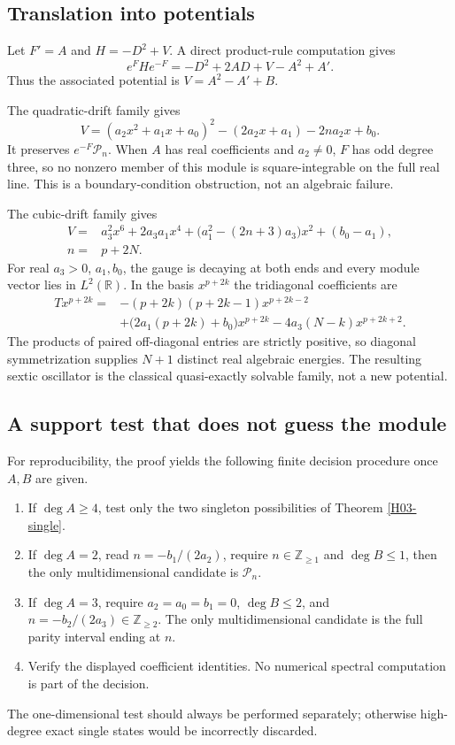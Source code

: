 \documentclass[11pt,a4paper]{article}
\theoremstyle{definition}\newtheorem{definition}[theorem]{Definition}
\theoremstyle{remark}\newtheorem{remark}[theorem]{Remark}
\newcommand{\R}{\mathbb R}\newcommand{\C}{\mathbb C}\newcommand{\N}{\mathbb N}
\newcommand{\Pcal}{\mathcal P}\newcommand{\PP}{\mathcal P}\newcommand{\Pp}{\mathcal P}
\numberwithin{equation}{section}
\begin{document}
\subsection{Translation into potentials}\label{H03-sec-5}
Let $F'=A$ and $H=-D^2+V$. A direct product-rule computation gives
\[e^FHe^{-F}=-D^2+2AD+V-A^2+A'.\]
Thus the associated potential is $V=A^2-A'+B$.

The quadratic-drift family gives
\[V=(a_2x^2+a_1x+a_0)^2-(2a_2x+a_1)-2na_2x+b_0.\]
It preserves $e^{-F}\Pcal_n$. When $A$ has real coefficients and $a_2\ne0$, $F$ has odd degree three, so no nonzero member of this module is square-integrable on the full real line. This is a boundary-condition obstruction, not an algebraic failure.

The cubic-drift family gives
\begin{align*}
V={}&a_3^2x^6+2a_3a_1x^4
+\bigl(a_1^2-(2n+3)a_3\bigr)x^2+(b_0-a_1),\\
n={}&p+2N.
\end{align*}
For real $a_3>0$, $a_1,b_0$, the gauge is decaying at both ends and every module vector lies in $L^2(\R)$. In the basis $x^{p+2k}$ the tridiagonal coefficients are
\begin{align*}
T x^{p+2k}={}&-(p+2k)(p+2k-1)x^{p+2k-2}\\
&+\bigl(2a_1(p+2k)+b_0\bigr)x^{p+2k}
-4a_3(N-k)x^{p+2k+2}.
\end{align*}
The products of paired off-diagonal entries are strictly positive, so diagonal symmetrization supplies $N+1$ distinct real algebraic energies. The resulting sextic oscillator is the classical quasi-exactly solvable family, not a new potential.
\subsection{A support test that does not guess the module}\label{H03-sec-6}
For reproducibility, the proof yields the following finite decision procedure once $A,B$ are given.
\begin{enumerate}
\item If $\deg A\ge4$, test only the two singleton possibilities of Theorem \ref{H03-single}.
\item If $\deg A=2$, read $n=-b_1/(2a_2)$, require $n\in\mathbb Z_{\ge1}$ and $\deg B\le1$, then the only multidimensional candidate is $\Pcal_n$.
\item If $\deg A=3$, require $a_2=a_0=b_1=0$, $\deg B\le2$, and $n=-b_2/(2a_3)\in\mathbb Z_{\ge2}$. The only multidimensional candidate is the full parity interval ending at $n$.
\item Verify the displayed coefficient identities. No numerical spectral computation is part of the decision.
\end{enumerate}
The one-dimensional test should always be performed separately; otherwise high-degree exact single states would be incorrectly discarded.
\end{document}
